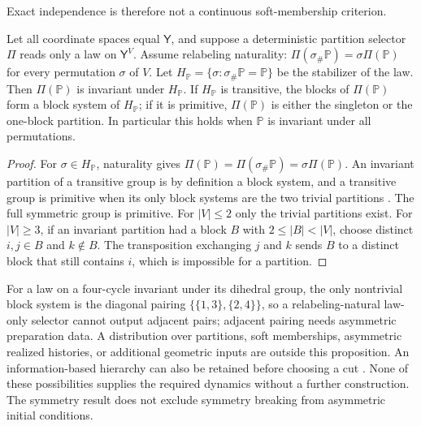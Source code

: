 Exact independence is therefore not a continuous soft-membership criterion.

Let all coordinate spaces equal $\mathsf Y$, and suppose a deterministic
partition selector $\Pi$ reads only a law on $\mathsf Y^V$. Assume
relabeling naturality: $\Pi(\sigma_\#\mathbb P)=\sigma\Pi(\mathbb P)$ for
every permutation $\sigma$ of $V$. Let
$H_{\mathbb P}=\{\sigma:\sigma_\#\mathbb P=\mathbb P\}$ be the stabilizer of
the law. Then $\Pi(\mathbb P)$ is invariant under $H_{\mathbb P}$. If
$H_{\mathbb P}$ is transitive, the blocks of $\Pi(\mathbb P)$ form a block
system of $H_{\mathbb P}$; if it is primitive, $\Pi(\mathbb P)$ is either the
singleton or the one-block partition. In particular this holds when
$\mathbb P$ is invariant under all permutations.
\begin{proof}
For $\sigma\in H_{\mathbb P}$, naturality gives
$\Pi(\mathbb P)=\Pi(\sigma_\#\mathbb P)=\sigma\Pi(\mathbb P)$. An invariant
partition of a transitive group is by definition a block system, and a
transitive group is primitive when its only block systems are the two
trivial partitions \citep{DixonMortimer1996}. The full symmetric group is
primitive. For $|V|\leq2$ only the trivial partitions exist. For
$|V|\geq3$, if an invariant partition had a block $B$ with
$2\leq|B|<|V|$, choose distinct $i,j\in B$ and $k\notin B$. The
transposition exchanging $j$ and $k$ sends $B$ to a distinct block that
still contains $i$, which is impossible for a partition.
\end{proof}

For a law on a four-cycle invariant under its dihedral group, the only
nontrivial block system is the diagonal pairing $\{\{1,3\},\{2,4\}\}$, so a
relabeling-natural law-only selector cannot output adjacent pairs; adjacent
pairing needs asymmetric preparation data. A distribution over partitions,
soft memberships, asymmetric realized histories, or additional geometric
inputs are outside this proposition. An information-based hierarchy can also
be retained before choosing a cut \citep{ChanEtAl2016}. None of these
possibilities supplies the required dynamics without a further construction.
The symmetry result does not exclude symmetry breaking from asymmetric
initial conditions.

